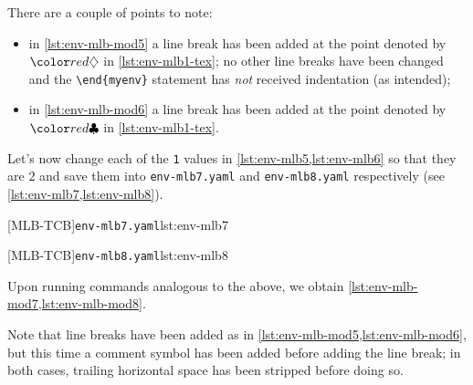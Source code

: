 	There are a couple of points to note:
	\begin{itemize}
		\item in \cref{lst:env-mlb-mod5} a line break has been added at the point denoted by $\EndStartsOnOwnLine$ in \vref{lst:env-mlb1-tex}; no
		      other line breaks have been changed and the \lstinline!\end{myenv}! statement has \emph{not} received indentation (as intended);
		\item in \cref{lst:env-mlb-mod6} a line break has been added at the point denoted by $\EndFinishesWithLineBreak$ in \vref{lst:env-mlb1-tex}.
	\end{itemize}

	Let's now change each of the \texttt{1} values in \cref{lst:env-mlb5,lst:env-mlb6} so that they are $2$ and
	save them into \texttt{env-mlb7.yaml} and \texttt{env-mlb8.yaml} respectively (see \cref{lst:env-mlb7,lst:env-mlb8}).

	\begin{minipage}{.49\textwidth}
		[MLB-TCB]{\texttt{env-mlb7.yaml}}{lst:env-mlb7}
	\end{minipage}
	\hfill
	\begin{minipage}{.49\textwidth}
		[MLB-TCB]{\texttt{env-mlb8.yaml}}{lst:env-mlb8}
	\end{minipage}

	Upon running  commands analogous to the above, we obtain \cref{lst:env-mlb-mod7,lst:env-mlb-mod8}.

	\begin{widepage}
		\begin{minipage}{.42\linewidth}
		\end{minipage}
		\hfill
		\begin{minipage}{.57\linewidth}
		\end{minipage}
	\end{widepage}

	Note that line breaks have been added as in \cref{lst:env-mlb-mod5,lst:env-mlb-mod6}, but this time a comment symbol
	has been added before adding the line break; in both cases, trailing horizontal
	space has been stripped before doing so.

